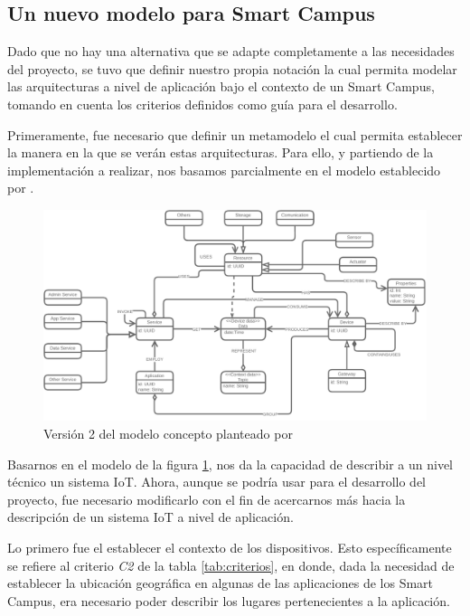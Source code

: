 \subsection{Un nuevo modelo para Smart Campus}

Dado que no hay una alternativa que se adapte completamente a las necesidades del proyecto, se tuvo que definir nuestro propia notación la cual permita modelar las arquitecturas a nivel de aplicación bajo el contexto de un Smart Campus, tomando en cuenta los criterios definidos como guía para el desarrollo.

Primeramente, fue necesario que definir un metamodelo el cual permita establecer la manera en la que se verán estas arquitecturas. Para ello, y partiendo de la implementación a realizar, nos basamos parcialmente en el modelo establecido por . 

\begin{figure}[H]
    \centering
    \caption{Versión 2 del modelo concepto planteado por}
    \label{fig:henrymodelo}
    \vspace{2mm}

    \includegraphics[width=\linewidth]{images/HenryModelo.pdf}
\end{figure}

Basarnos en el modelo de la figura \ref{fig:henrymodelo}, nos da la capacidad de describir a un nivel técnico un sistema IoT. Ahora, aunque se podría usar para el desarrollo del proyecto, fue necesario modificarlo con el fin de acercarnos más hacia la descripción de un sistema IoT a nivel de aplicación. 

Lo primero fue el establecer el contexto de los dispositivos. Esto específicamente se refiere al criterio \textit{C2} de la tabla \ref{tab:criterios}, en donde, dada la necesidad de establecer la ubicación geográfica en algunas de las aplicaciones de los Smart Campus, era necesario poder describir los lugares pertenecientes a la aplicación.


